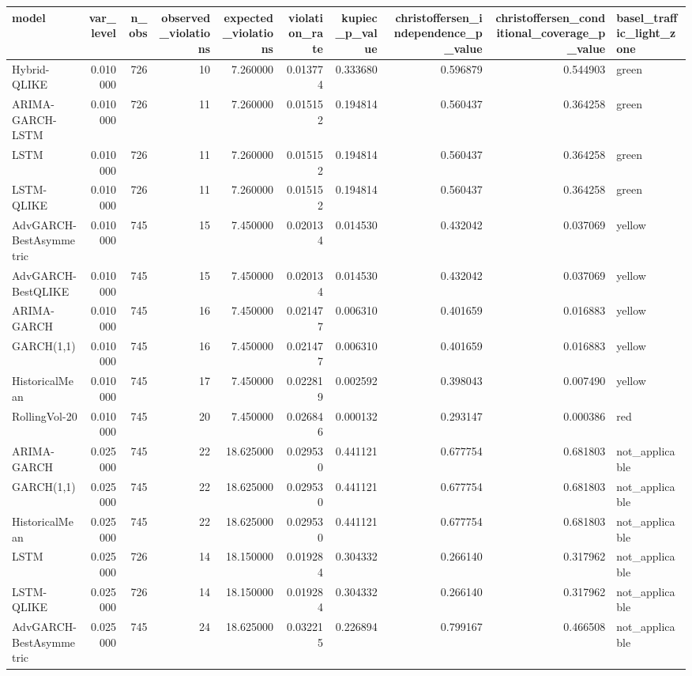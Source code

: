 \begin{tabular}{l r r r r r r r r l}
\hline
model & var\_level & n\_obs & observed\_violations & expected\_violations & violation\_rate & kupiec\_p\_value & christoffersen\_independence\_p\_value & christoffersen\_conditional\_coverage\_p\_value & basel\_traffic\_light\_zone \\
\hline
Hybrid-QLIKE & 0.010000 & 726 & 10 & 7.260000 & 0.013774 & 0.333680 & 0.596879 & 0.544903 & green \\
ARIMA-GARCH-LSTM & 0.010000 & 726 & 11 & 7.260000 & 0.015152 & 0.194814 & 0.560437 & 0.364258 & green \\
LSTM & 0.010000 & 726 & 11 & 7.260000 & 0.015152 & 0.194814 & 0.560437 & 0.364258 & green \\
LSTM-QLIKE & 0.010000 & 726 & 11 & 7.260000 & 0.015152 & 0.194814 & 0.560437 & 0.364258 & green \\
AdvGARCH-BestAsymmetric & 0.010000 & 745 & 15 & 7.450000 & 0.020134 & 0.014530 & 0.432042 & 0.037069 & yellow \\
AdvGARCH-BestQLIKE & 0.010000 & 745 & 15 & 7.450000 & 0.020134 & 0.014530 & 0.432042 & 0.037069 & yellow \\
ARIMA-GARCH & 0.010000 & 745 & 16 & 7.450000 & 0.021477 & 0.006310 & 0.401659 & 0.016883 & yellow \\
GARCH(1,1) & 0.010000 & 745 & 16 & 7.450000 & 0.021477 & 0.006310 & 0.401659 & 0.016883 & yellow \\
HistoricalMean & 0.010000 & 745 & 17 & 7.450000 & 0.022819 & 0.002592 & 0.398043 & 0.007490 & yellow \\
RollingVol-20 & 0.010000 & 745 & 20 & 7.450000 & 0.026846 & 0.000132 & 0.293147 & 0.000386 & red \\
ARIMA-GARCH & 0.025000 & 745 & 22 & 18.625000 & 0.029530 & 0.441121 & 0.677754 & 0.681803 & not\_applicable \\
GARCH(1,1) & 0.025000 & 745 & 22 & 18.625000 & 0.029530 & 0.441121 & 0.677754 & 0.681803 & not\_applicable \\
HistoricalMean & 0.025000 & 745 & 22 & 18.625000 & 0.029530 & 0.441121 & 0.677754 & 0.681803 & not\_applicable \\
LSTM & 0.025000 & 726 & 14 & 18.150000 & 0.019284 & 0.304332 & 0.266140 & 0.317962 & not\_applicable \\
LSTM-QLIKE & 0.025000 & 726 & 14 & 18.150000 & 0.019284 & 0.304332 & 0.266140 & 0.317962 & not\_applicable \\
AdvGARCH-BestAsymmetric & 0.025000 & 745 & 24 & 18.625000 & 0.032215 & 0.226894 & 0.799167 & 0.466508 & not\_applicable \\

\end{tabular}
